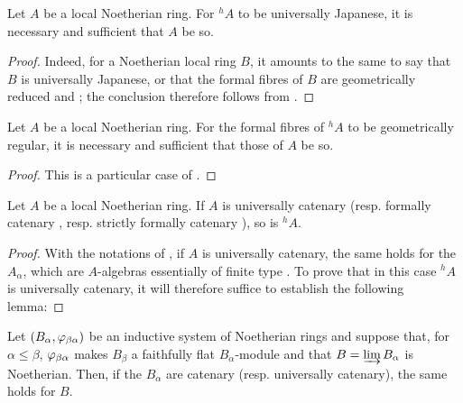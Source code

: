 \begin{corollary}[18.7.3]
\label{IV.18.7.3}
Let $A$ be a local Noetherian ring.
For ${}^h\!A$ to be universally Japanese, it is necessary and sufficient that $A$ be so.
\end{corollary}

\begin{proof}
Indeed, for a Noetherian local ring $B$, it amounts to the same to say that $B$ is universally Japanese, or that the formal fibres of $B$ are geometrically reduced  and ;
the conclusion therefore follows from .
\end{proof}

\begin{corollary}[18.7.4]
\label{IV.18.7.4}
Let $A$ be a local Noetherian ring.
For the formal fibres of ${}^h\!A$ to be geometrically regular, it is necessary and sufficient that those of $A$ be so.
\end{corollary}

\begin{proof}
This is a particular case of .
\end{proof}

\begin{proposition}[18.7.5]
\label{IV.18.7.5}
Let $A$ be a local Noetherian ring.
If $A$ is universally catenary  \textup{(resp.} formally catenary \textup{, resp.} strictly formally catenary \textup{)}, so is ${}^h\!A$.
\end{proposition}

\begin{proof}
With the notations of , if $A$ is universally catenary, the same holds for the $A_\alpha$, which are $A$-algebras essentially of finite type .
To prove that in this case ${}^h\!A$ is universally catenary, it will therefore suffice to establish the following lemma:
\end{proof}

\begin{lemma}[18.7.5.1]
\label{IV.18.7.5.1}
Let $(B_\alpha,\varphi_{\beta\alpha})$ be an inductive system of Noetherian rings and suppose that, for $\alpha\leq\beta$, $\varphi_{\beta\alpha}$ makes $B_\beta$ a faithfully flat $B_\alpha$-module and that $B=\varinjlim B_\alpha$ is Noetherian.
Then, if the $B_\alpha$ are catenary \textup{(resp.} universally catenary\textup{)}, the same holds for $B$.
\end{lemma}

